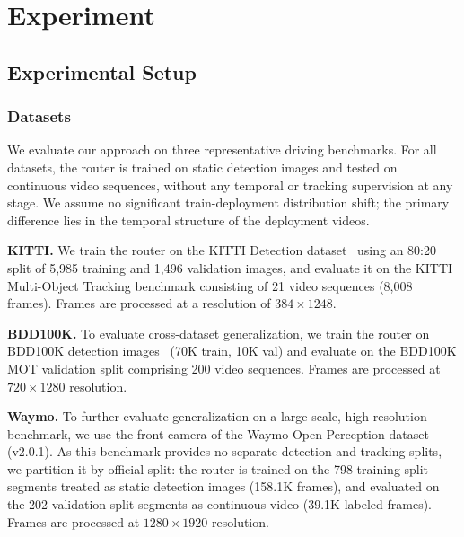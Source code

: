 \section{Experiment}
\label{sec:exp}

\subsection{Experimental Setup}

\subsubsection{Datasets}
\label{sec:setup_data}
We evaluate our approach on three representative driving benchmarks. 
For all datasets, the router is trained on static detection images and tested on continuous video sequences, without any temporal or tracking supervision at any stage.
We assume no significant train-deployment distribution shift; the primary difference lies in the temporal structure of the deployment videos.

\noindent\textbf{KITTI.} 
We train the router on the KITTI Detection dataset~\cite{geiger2012kitti} using an 80:20 split of 5,985 training and 1,496 validation images, and evaluate it on the KITTI Multi-Object Tracking benchmark consisting of 21 video sequences (8,008 frames). 
Frames are processed at a resolution of $384\times1248$.

\noindent\textbf{BDD100K.} 
To evaluate cross-dataset generalization, we train the router on BDD100K detection images~\cite{yu2020bdd} (70K train, 10K val) and evaluate on the BDD100K MOT validation split comprising 200 video sequences. 
Frames are processed at $720\times1280$ resolution.

\noindent\textbf{Waymo.}
To further evaluate generalization on a large-scale, high-resolution benchmark, we use the front camera of the Waymo Open Perception dataset~\cite{sun2020waymo} (v2.0.1). 
As this benchmark provides no separate detection and tracking splits, we partition it by official split: the router is trained on the 798 training-split segments treated as static detection images (158.1K frames), and evaluated on the 202 validation-split segments as continuous video (39.1K labeled frames).
Frames are processed at $1280\times1920$ resolution.


